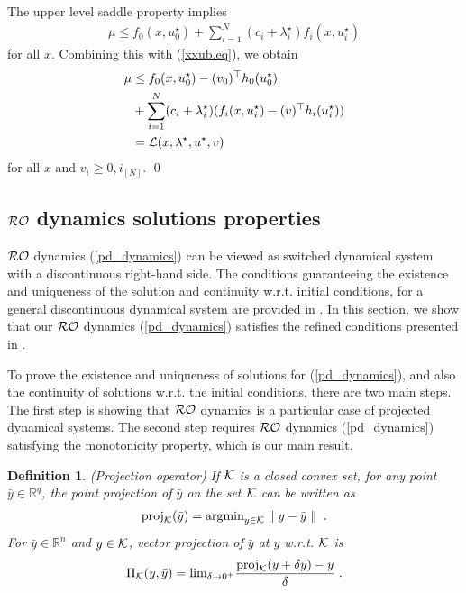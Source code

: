 \documentclass[journal,twoside,web]{ieeecolor}
\newtheorem{definition}{Definition}
\begin{document}
\noindent
The upper level saddle property implies 
\begin{align*}
\mu\leq f_0(x,u_0^\star)+\sum_{i=1}^N(c_i+\lambda_i^\star)f_i(x,u_i^\star)
\end{align*}
for all $x$. Combining this with (\ref{xxub.eq}), we obtain
\begin{align*}
\mu&\leq f_0(x,u_0^\star)-(v_0)^\top h_0(u_0^\star)\\
&+\sum_{i=1}^N(c_i+\lambda_i^\star)(f_i(x,u_i^\star)-(v)^\top h_i(u_i^\star))\\
&={\cal L}(x,\lambda^\star,u^\star,v)
\end{align*}
for all $x$ and $v_i\geq 0, i_{[N]}$.
\qed

\subsection{${\cal RO}$ dynamics solutions properties}\label{existence.sec}
${\cal RO}$ dynamics (\ref{pd_dynamics}) can be viewed as switched dynamical system with a discontinuous right-hand side. The conditions guaranteeing the existence and uniqueness of the solution and continuity w.r.t. initial conditions, for a general discontinuous dynamical system are provided in \cite[Theorem~2.5]{nagurney2012projected}. In this section, we show that our ${\cal RO}$ dynamics (\ref{pd_dynamics}) satisfies the refined conditions presented in \cite{cherukuri2016}.

To prove the existence and uniqueness of solutions for (\ref{pd_dynamics}), and also the continuity of solutions w.r.t. the initial conditions, there are two main steps. The first step is showing that ${\cal RO}$ dynamics is a particular case of projected dynamical systems. The second step requires ${\cal RO}$ dynamics (\ref{pd_dynamics}) satisfying the monotonicity property, which is our main result.

\begin{definition} \label{projection_operator} (Projection operator)
If ${\cal K}$ is a closed convex set, for any point $\bar y \in \mathbb R^q$, the point projection of $\bar y$ on the set ${\cal K}$ can be written as
\begin{align*}
\text{proj}_{\cal K}(\bar y)=\text{argmin}_{y \in {\cal K}} \parallel y-\bar y \parallel\;.
\end{align*}
For $\bar y \in \mathbb R^n$ and $y \in {\cal K}$, vector projection of $\bar y$ at $y$ w.r.t. ${\cal K}$ is
\begin{align}
\label{projection_operator}
\Pi_{\cal K}(y,\bar y) = \text{lim}_{\delta \rightarrow 0^+} \frac{\text{proj}_{\cal K}(y+\delta \bar y)-y}{\delta}\;.
\end{align}
\end{definition}
\end{document}
